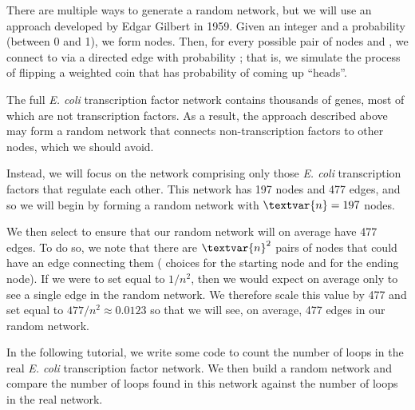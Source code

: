 There are multiple ways to generate a random network, but we will use an approach developed by Edgar Gilbert in 1959. Given an integer  and a probability  (between 0 and 1), we form  nodes. Then, for every possible pair of nodes  and , we connect  to  via a directed edge with probability ; that is, we simulate the process of flipping a weighted coin that has probability  of coming up ``heads''.\\

\begin{note}\end{note}

\begin{qbox}\end{qbox}

The full \textit{E. coli} transcription factor network contains thousands of genes, most of which are not transcription factors. As a result, the approach described above may form a random network that connects non-transcription factors to other nodes, which we should avoid.

Instead, we will focus on the network comprising only those \textit{E. coli} transcription factors that regulate each other. This network has 197 nodes and 477 edges, and so we will begin by forming a random network with $\textvar{n} = 197$ nodes.

We then select  to ensure that our random network will on average have 477 edges. To do so, we note that there are $\textvar{n}^2$ pairs of nodes that could have an edge connecting them ( choices for the starting node and  for the ending node). If we were to set  equal to $1/n^2$, then we would expect on average only to see a single edge in the random network. We therefore scale this value by 477 and set  equal to $477/n^2 \approx 0.0123$ so that we will see, on average, 477 edges in our random network.

In the following tutorial, we write some code to count the number of loops in the real \textit{E. coli} transcription factor network. We then build a random network and compare the number of loops found in this network against the number of loops in the real network.

